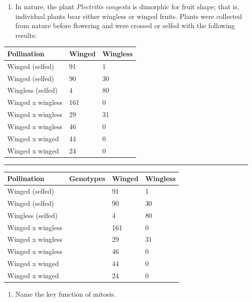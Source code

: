 \documentclass[11pt,]{article}
\providecommand{\tightlist}{%
  \setlength{\itemsep}{0pt}\setlength{\parskip}{0pt}}
\begin{document}
\begin{blackbox}

\begin{enumerate}
\def\labelenumi{\arabic{enumi}.}
\setcounter{enumi}{48}
\tightlist
\item
  In nature, the plant \emph{Plectritis congesta} is dimorphic for fruit
  shape; that is, individual plants bear either wingless or winged
  fruits. Plants were collected from nature before flowering and were
  crossed or selfed with the following results:
\end{enumerate}

\hfill\break

\begin{longtable}[]{@{}lll@{}}
\toprule
Pollination & Winged & Wingless\tabularnewline
\midrule
\endhead
Winged (selfed) & 91 & 1\tabularnewline
Winged (selfed) & 90 & 30\tabularnewline
Wingless (selfed) & 4 & 80\tabularnewline
Winged x wingless & 161 & 0\tabularnewline
Winged x wingless & 29 & 31\tabularnewline
Winged x wingless & 46 & 0\tabularnewline
Winged x winged & 44 & 0\tabularnewline
Winged x winged & 24 & 0\tabularnewline
\bottomrule
\end{longtable}

\begin{center}\rule{0.5\linewidth}{0.5pt}\end{center}

\hfill\break

\begin{longtable}[]{@{}llll@{}}
\toprule
Pollination & Genotypes & Winged & Wingless\tabularnewline
\midrule
\endhead
Winged (selfed) & & 91 & 1\tabularnewline
Winged (selfed) & & 90 & 30\tabularnewline
Wingless (selfed) & & 4 & 80\tabularnewline
Winged x wingless & & 161 & 0\tabularnewline
Winged x wingless & & 29 & 31\tabularnewline
Winged x wingless & & 46 & 0\tabularnewline
Winged x winged & & 44 & 0\tabularnewline
Winged x winged & & 24 & 0\tabularnewline
\bottomrule
\end{longtable}

\vspace{7cm}

\end{blackbox}

\begin{blackbox}

\begin{enumerate}
\def\labelenumi{\arabic{enumi}.}
\setcounter{enumi}{17}
\tightlist
\item
  Name the key function of mitosis.
\end{enumerate}

\vspace{19cm}

\end{blackbox}
\end{document}
